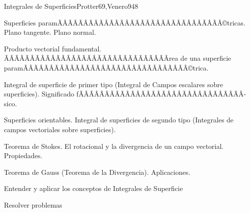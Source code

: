 \begin{sumilla}
\begin{unit}{Integrales de Superficies}{Protter69,Venero94}{8}
   \begin{topicos}
         \item  Superficies paramÃÂÃÂÃÂÃÂÃÂÃÂÃÂÃÂÃÂÃÂÃÂÃÂÃÂÃÂÃÂÃÂ©tricas. Plano tangente. Plano normal.
	 \item  Producto vectorial fundamental. ÃÂÃÂÃÂÃÂÃÂÃÂÃÂÃÂÃÂÃÂÃÂÃÂÃÂÃÂÃÂÃÂrea de una superficie paramÃÂÃÂÃÂÃÂÃÂÃÂÃÂÃÂÃÂÃÂÃÂÃÂÃÂÃÂÃÂÃÂ©trica.
         \item  Integral de superficie de primer tipo (Integral de Campos escalares sobre superficies). Significado fÃÂÃÂÃÂÃÂÃÂÃÂÃÂÃÂÃÂÃÂÃÂÃÂÃÂÃÂÃÂÃÂ­sico.
	 \item  Superficies orientables. Integral de superficies de segundo tipo (Integrales de campos vectoriales sobre superficies).
         \item  Teorema de Stokes. El rotacional y la divergencia de un campo vectorial. Propiedades.
         \item  Teorema de Gauss (Teorema de la Divergencia). Aplicaciones.
   \end{topicos}

   \begin{objetivos}
         \item  Entender y aplicar los conceptos de Integrales de Superficie
         \item  Resolver problemas
   \end{objetivos}
\end{unit}

\begin{bibliografia}
\end{bibliografia}

\end{sumilla}


